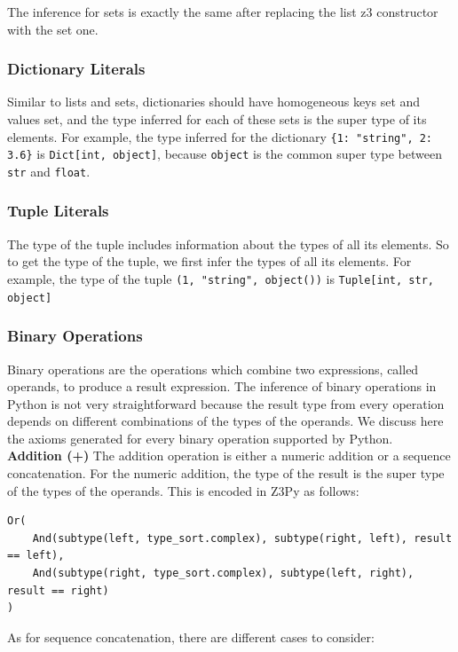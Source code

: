 The inference for sets is exactly the same after replacing the list z3 constructor with the set one.


\subsubsection{Dictionary Literals}
Similar to lists and sets, dictionaries should have homogeneous keys set and values set, and the type inferred for each of these sets is the super type of its elements. For example, the type inferred for the dictionary \lstinline|{1: "string", 2: 3.6}| is \lstinline|Dict[int, object]|, because \lstinline|object| is the common super type between \lstinline|str| and \lstinline|float|.


\subsubsection{Tuple Literals}
The type of the tuple includes information about the types of all its elements. So to get the type of the tuple, we first infer the types of all its elements. For example, the type of the tuple \lstinline|(1, "string", object())| is \lstinline|Tuple[int, str, object]|

\subsubsection{Binary Operations}
Binary operations are the operations which combine two expressions, called operands, to produce a result expression. The inference of binary operations in Python is not very straightforward because the result type from every operation depends on different combinations of the types of the operands. We discuss here the axioms generated for every binary operation supported by Python.\\

\textbf{Addition (+)}
The addition operation is either a numeric addition or a sequence concatenation. For the numeric addition, the type of the result is the super type of the types of the operands. This is encoded in Z3Py as follows:

\begin{lstlisting}
Or(
	And(subtype(left, type_sort.complex), subtype(right, left), result == left),
	And(subtype(right, type_sort.complex), subtype(left, right), result == right)
)
\end{lstlisting}

As for sequence concatenation, there are different cases to consider:

